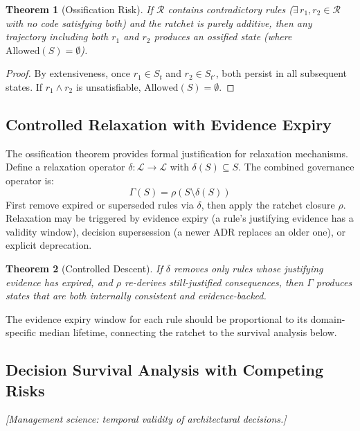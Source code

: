 \documentclass[11pt, a4paper, logo, copyright]{googledeepmind}
\newtheorem{theorem}{Theorem}[section]
\begin{document}
\begin{theorem}[Ossification Risk]
\label{thm:ossification}
If $\mathcal{R}$ contains contradictory rules ($\exists\, r_1, r_2 \in \mathcal{R}$ with no code satisfying both) and the ratchet is purely additive, then any trajectory including both $r_1$ and $r_2$ produces an ossified state (where $\mathrm{Allowed}(S) = \emptyset$).
\end{theorem}

\begin{proof}
By extensiveness, once $r_1 \in S_t$ and $r_2 \in S_{t'}$, both persist in all subsequent states. If $r_1 \wedge r_2$ is unsatisfiable, $\mathrm{Allowed}(S) = \emptyset$.
\end{proof}

\subsection{Controlled Relaxation with Evidence Expiry}

The ossification theorem provides formal justification for relaxation mechanisms. Define a relaxation operator $\delta: \mathcal{L} \to \mathcal{L}$ with $\delta(S) \subseteq S$. The combined governance operator is:
\begin{equation}
    \Gamma(S) = \rho(S \setminus \delta(S))
\end{equation}
First remove expired or superseded rules via $\delta$, then apply the ratchet closure $\rho$. Relaxation may be triggered by evidence expiry (a rule's justifying evidence has a validity window), decision supersession (a newer ADR replaces an older one), or explicit deprecation.

\begin{theorem}[Controlled Descent]
If $\delta$ removes only rules whose justifying evidence has expired, and $\rho$ re-derives still-justified consequences, then $\Gamma$ produces states that are both internally consistent and evidence-backed.
\end{theorem}

The evidence expiry window for each rule should be proportional to its domain-specific median lifetime, connecting the ratchet to the survival analysis below.

\subsection{Decision Survival Analysis with Competing Risks}
\emph{[Management science: temporal validity of architectural decisions.]}
\end{document}
